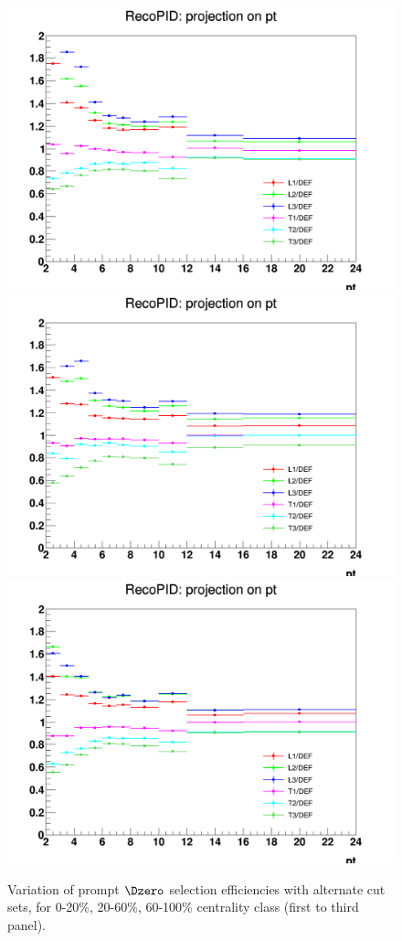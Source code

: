 \begin{figure}
\centering
{\includegraphics[width=0.48\linewidth]{figuresVsCent/Dzero/SystDcuts/CutVarEff_020.png}}
{\includegraphics[width=0.48\linewidth]{figuresVsCent/Dzero/SystDcuts/CutVarEff_2060.png}}
{\includegraphics[width=0.48\linewidth]{figuresVsCent/Dzero/SystDcuts/CutVarEff_60100.png}}
\caption{Variation of prompt $\Dzero$ selection efficiencies with alternate cut sets, for 0-20\%, 20-60\%, 60-100\% centrality class (first to third panel).}
\label{fig:EffVariations}
\end{figure}
